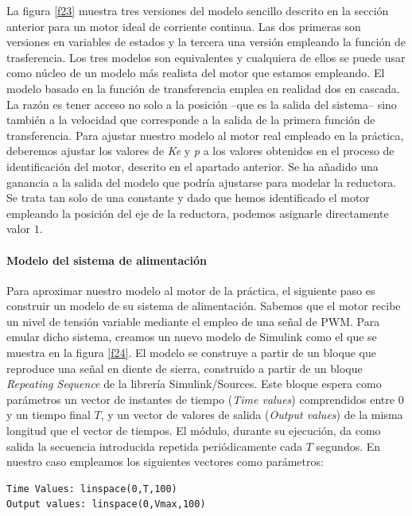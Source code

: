 \documentclass[10pt,a4paper]{report}
\begin{document}
La figura \ref{f23} muestra tres versiones del modelo sencillo descrito en la sección anterior para un motor ideal de corriente continua. Las dos primeras son  versiones en variables de estados y la tercera una versión empleando la función de trasferencia. Los tres modelos son equivalentes y cualquiera de ellos se puede usar como núcleo de un modelo más realista del motor que estamos empleando. El modelo basado en la función de transferencia emplea en realidad dos en cascada. La razón es tener acceso no solo a la posición --que es la salida del sistema-- sino también a la velocidad que corresponde a la salida de la primera función de transferencia. Para ajustar nuestro modelo al motor real empleado en la práctica, deberemos ajustar los valores de \emph{Ke} y \emph{p} a los valores obtenidos en el proceso de identificación del motor, descrito en el apartado anterior. Se ha añadido una ganancia a la salida del modelo que podría ajustarse para modelar la reductora. Se trata tan solo de una constante y dado que hemos identificado el motor empleando la posición del eje de la reductora, podemos asignarle directamente valor $1$. 

\paragraph{Modelo del sistema de alimentación} Para aproximar nuestro modelo al motor de la práctica, el siguiente paso es construir un modelo de su sistema de alimentación. Sabemos que el motor recibe un nivel de tensión variable mediante el empleo de una señal de PWM. Para emular dicho sistema, creamos un nuevo modelo de Simulink como el que se muestra en la figura \ref{f24}. El modelo se construye a partir de un bloque que reproduce una señal en diente de sierra, construido a partir de un bloque \emph{Repeating Sequence} de la librería Simulink/Sources. Este bloque espera como parámetros un vector de instantes de tiempo (\emph{Time values}) comprendidos entre $0$ y un tiempo final $T$, y un vector de valores de salida (\emph{Output values}) de la misma longitud que el vector de tiempos. El módulo, durante su ejecución, da como salida la secuencia introducida repetida periódicamente cada $T$ segundos. En nuestro caso empleamos los siguientes vectores como parámetros:
\begin{verbatim}
Time Values: linspace(0,T,100)
Output values: linspace(0,Vmax,100)
\end{verbatim}
\end{document}
